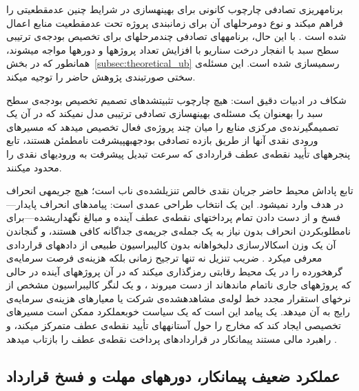 برنامه\zwnj{}ریزی تصادفی \citep{Birge2011} چارچوب  کانونی
برای بهینه\zwnj{}سازی در شرایط چنین عدم\zwnj{}قطعیتی را فراهم می\zwnj{}کند
و نوع دومرحله\zwnj{}ای آن برای زمان\zwnj{}بندی پروژه
تحت عدم\zwnj{}قطعیت منابع اعمال شده است \citep{Lova2000}.
با این حال، برنامه\zwnj{}های تصادفی چندمرحله\zwnj{}ای برای
تخصیص بودجه‌ی ترتیبی سطح سبد با انفجار درخت سناریو
با افزایش تعداد پروژه\zwnj{}ها و دوره\zwnj{}ها مواجه می\zwnj{}شوند،
همان\zwnj{}طور که در بخش~\ref{subsec:theoretical_ub} رسمی\zwnj{}سازی شده است.
این مسئله‌ی سختی صورت\zwnj{}بندی  پژوهش حاضر را توجیه می\zwnj{}کند.

شکاف در ادبیات دقیق است: هیچ چارچوب تثبیت\zwnj{}شده\zwnj{}ای
تصمیم تخصیص بودجه‌ی سطح سبد را به\zwnj{}عنوان یک مسئله‌ی
بهینه\zwnj{}سازی تصادفی ترتیبی مدل نمی\zwnj{}کند که در آن
یک تصمیم\zwnj{}گیرنده‌ی مرکزی منابع را میان چند پروژه‌ی فعال
تخصیص می\zwnj{}دهد که مسیرهای ورودی نقدی آن\zwnj{}ها از طریق
بازده تصادفی بودجه\zwnj{}به\zwnj{}پیشرفت نامطمئن هستند،
تابع پنجره\zwnj{}های تأیید نقطه‌ی عطف قراردادی
که سرعت تبدیل پیشرفت به ورودی\zwnj{}های نقدی را محدود می\zwnj{}کنند.

تابع پاداش محیط حاضر جریان نقدی خالص تنزیل\zwnj{}شده‌ی ناب است؛
هیچ جریمه\zwnj{}ی انحراف در هدف وارد نمی\zwnj{}شود.
این یک انتخاب طراحی عمدی است: پیامدهای انحراف پایدار---
فسخ و از دست دادن تمام پرداخت\zwnj{}های نقطه‌ی عطف آینده
و مبالغ نگه\zwnj{}داری\zwnj{}شده---برای نامطلوب\zwnj{}کردن انحراف
بدون نیاز به یک جمله‌ی جریمه‌ی جداگانه کافی هستند،
و گنجاندن آن یک وزن اسکالارسازی دلبخواهانه
بدون کالیبراسیون طبیعی از داده\zwnj{}های قراردادی معرفی می\zwnj{}کرد \citep{Ng1999}.
ضریب تنزیل نه تنها ترجیح زمانی بلکه
هزینه‌ی فرصت سرمایه‌ی گره\zwnj{}خورده را در یک محیط رقابتی رمزگذاری می\zwnj{}کند
که در آن پروژه\zwnj{}های آینده در حالی که پروژه\zwnj{}های جاری ناتمام مانده\zwnj{}اند
از دست می\zwnj{}روند \citep{Damodaran2012}،
و یک لنگر کالیبراسیون مشخص از نرخ\zwnj{}های استقرار مجدد خط لوله‌ی مشاهده\zwnj{}شده‌ی شرکت
یا معیارهای هزینه‌ی سرمایه‌ی رایج به آن می\zwnj{}دهد.
یک پیامد این است که یک سیاست خوب\zwnj{}عملکرد ممکن است
مسیرهای تخصیصی ایجاد کند که مخارج را حول آستانه\zwnj{}های تأیید نقطه‌ی عطف
متمرکز می\zwnj{}کند، و راهبرد مالی مستند پیمانکار در قراردادهای پرداخت نقطه‌ی عطف
را بازتاب می\zwnj{}دهد \citep{Kenley2009, Kaka1993, Arditi2005}.

\subsection{عملکرد ضعیف پیمانکار، دوره\zwnj{}های مهلت و فسخ قرارداد}
\label{subsec:lr_interventions}

